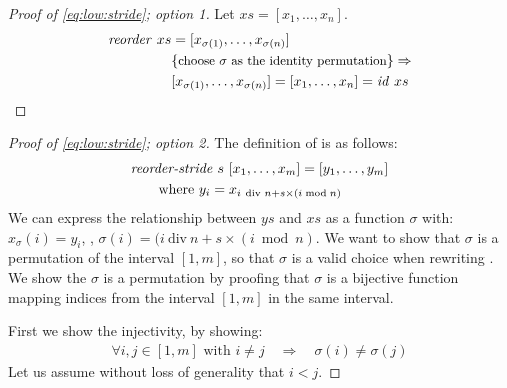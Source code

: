 \begin{proof}[Proof of \autoref{eq:low:stride}; option 1]
  Let $xs = [x_1, \ldots, x_n]$.
  \begin{align*}
    \text{\textit{reorder}}\ xs &= [x_{\sigma(1)}, \ldots, x_{\sigma(n)}]\\
                 &\{\text{\small choose $\sigma$ as the identity permutation}\} \Rightarrow\\
                 & [x_{\sigma(1)}, \ldots, x_{\sigma(n)}] = [x_1, \ldots, x_n] = \text{\textit{id}}\ xs
  \end{align*}
\end{proof}
\begin{proof}[Proof of \autoref{eq:low:stride}; option 2]
  The definition of \reorderStride is as follows:
  \begin{align*}
    &\text{\textit{reorder-stride}}\ s\ [x_1, \ldots, x_m] = [y_1, \ldots, y_m]\\
    &\qquad \text{where}\ y_i = x_{i\ \text{\normalfont div } n + s\times (i \bmod{n})}
  \end{align*}
  We can express the relationship between $ys$ and $xs$ as a function $\sigma$ with: $x_\sigma(i) = y_i$, \ie, $\sigma(i) = (i\ \text{div}\ n + s\times (i \bmod{n})$.
  We want to show that $\sigma$ is a permutation of the interval $[1, m]$, so that $\sigma$ is a valid choice when rewriting \reduce.
  We show the $\sigma$ is a permutation by proofing that $\sigma$ is a bijective function mapping indices from the interval $[1,m]$ in the same interval.

  First we show the injectivity, by showing:
  \begin{align*}
    \forall i, j \in [1, m] \text{ with } i\neq j \quad \Rightarrow \quad \sigma(i)\neq \sigma(j)
  \end{align*}
  Let us assume without loss of generality that $i< j$.


\end{proof}
